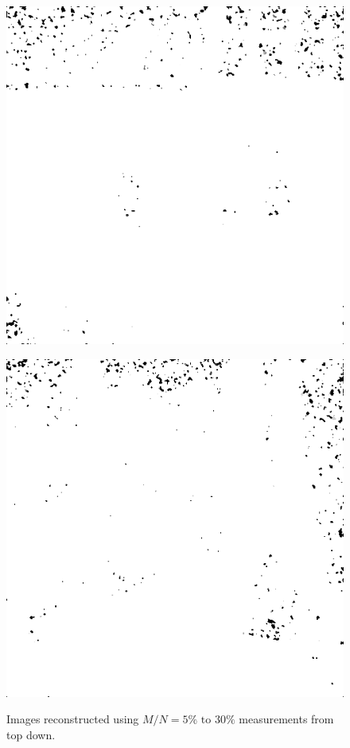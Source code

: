 \begin{figure}[H]
\begin{minipage}[t]{0.3\linewidth}
	\label{fig:car_m30}
\end{minipage}
\begin{minipage}[t]{0.3\linewidth} %
	\includegraphics[width = 1\linewidth]{gfx/hus/hus_m30.png}
	\subcaption{}
	\label{fig:hus_m30}
\end{minipage}
\begin{minipage}[t]{0.3\linewidth} %
	\includegraphics[width = 1\linewidth]{gfx/sit/sit_m30.png}
	\subcaption{}
	\label{fig:sit_m30}
\end{minipage}
	\caption{Images reconstructed using $M/N = 5\% \text{ to } 30\%$ measurements from top down.} 
\end{figure}

